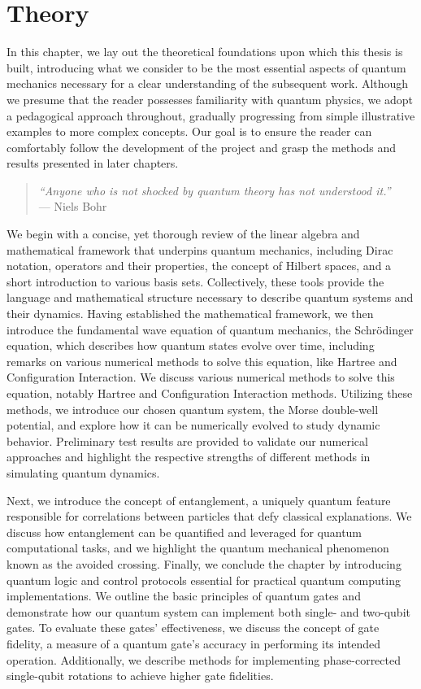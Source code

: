\documentclass{subfiles}
\begin{document}
\chapter{Theory}\label{chap:2}
In this chapter, we lay out the theoretical foundations upon which this thesis is built, introducing what we consider to be the most essential aspects of quantum mechanics necessary for a clear understanding of the subsequent work. Although we presume that the reader possesses familiarity with quantum physics, we adopt a pedagogical approach throughout, gradually progressing from simple illustrative examples to more complex concepts. Our goal is to ensure the reader can comfortably follow the development of the project and grasp the methods and results presented in later chapters.

\begin{quote}
    \centering
    \textit{“Anyone who is not shocked by quantum theory has not understood it.”}\\
    \vspace{0.2cm}
    --- Niels Bohr
\end{quote}


We begin with a concise, yet thorough review of the linear algebra and mathematical framework that underpins quantum mechanics, including Dirac notation, operators and their properties, the concept of Hilbert spaces, and a short introduction to various basis sets. Collectively, these tools provide the language and mathematical structure necessary to describe quantum systems and their dynamics. Having established the mathematical framework, we then introduce the fundamental wave equation of quantum mechanics, the Schrödinger equation, which describes how quantum states evolve over time, including remarks on various numerical methods to solve this equation, like Hartree and Configuration Interaction. We discuss various numerical methods to solve this equation, notably Hartree and Configuration Interaction methods. Utilizing these methods, we introduce our chosen quantum system, the Morse double-well potential, and explore how it can be numerically evolved to study dynamic behavior. Preliminary test results are provided to validate our numerical approaches and highlight the respective strengths of different methods in simulating quantum dynamics.

Next, we introduce the concept of entanglement, a uniquely quantum feature responsible for correlations between particles that defy classical explanations. We discuss how entanglement can be quantified and leveraged for quantum computational tasks, and we highlight the quantum mechanical phenomenon known as the avoided crossing.
Finally, we conclude the chapter by introducing quantum logic and control protocols essential for practical quantum computing implementations. We outline the basic principles of quantum gates and demonstrate how our quantum system can implement both single- and two-qubit gates. To evaluate these gates' effectiveness, we discuss the concept of gate fidelity, a measure of a quantum gate's accuracy in performing its intended operation. Additionally, we describe methods for implementing phase-corrected single-qubit rotations to achieve higher gate fidelities.
\end{document}

